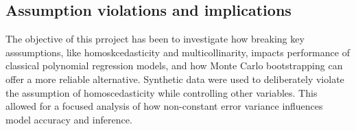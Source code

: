 
\subsection{Assumption violations and implications}
The objective of this prroject has been to investigate how breaking key asssumptions, like homoskcedasticity and multicollinarity, impacts performance of classical polynomial regression models, and how Monte Carlo bootstrapping can offer a more reliable alternative. Synthetic data were used to deliberately violate the assumption of homoscedasticity while controlling other variables. This allowed for a focused analysis of how non-constant error variance influences model accuracy and inference.


